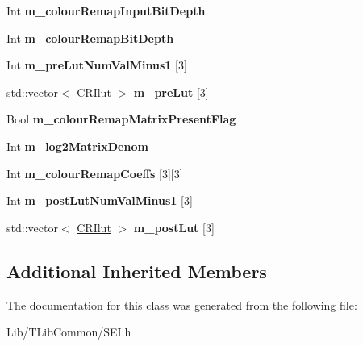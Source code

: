 \begin{DoxyCompactItemize}
Int {\bfseries m\+\_\+colour\+Remap\+Input\+Bit\+Depth}
\item 
\mbox{\label{class_s_e_i_colour_remapping_info_ad3ddd692b51212b40cd3d468e1772eda}} 
Int {\bfseries m\+\_\+colour\+Remap\+Bit\+Depth}
\item 
\mbox{\label{class_s_e_i_colour_remapping_info_aa8bd3d3abc6130df1340ce702e711489}} 
Int {\bfseries m\+\_\+pre\+Lut\+Num\+Val\+Minus1} \mbox{[}3\mbox{]}
\item 
\mbox{\label{class_s_e_i_colour_remapping_info_a01098088d6b2a8e0710ec396111d0517}} 
std\+::vector$<$ \hyperlink{struct_s_e_i_colour_remapping_info_1_1_c_r_ilut}{C\+R\+Ilut} $>$ {\bfseries m\+\_\+pre\+Lut} \mbox{[}3\mbox{]}
\item 
\mbox{\label{class_s_e_i_colour_remapping_info_a83fd91ab23946ef02048a2accc0d787d}} 
Bool {\bfseries m\+\_\+colour\+Remap\+Matrix\+Present\+Flag}
\item 
\mbox{\label{class_s_e_i_colour_remapping_info_a97ecf30ec961cce6f7b96b1757df0920}} 
Int {\bfseries m\+\_\+log2\+Matrix\+Denom}
\item 
\mbox{\label{class_s_e_i_colour_remapping_info_af10c1420862e07cf9831a77776d48329}} 
Int {\bfseries m\+\_\+colour\+Remap\+Coeffs} \mbox{[}3\mbox{]}\mbox{[}3\mbox{]}
\item 
\mbox{\label{class_s_e_i_colour_remapping_info_a78e3e6b3a05fdf36d98f610986c44c0a}} 
Int {\bfseries m\+\_\+post\+Lut\+Num\+Val\+Minus1} \mbox{[}3\mbox{]}
\item 
\mbox{\label{class_s_e_i_colour_remapping_info_abd4971cf45bb1a102137f8a246e73fc3}} 
std\+::vector$<$ \hyperlink{struct_s_e_i_colour_remapping_info_1_1_c_r_ilut}{C\+R\+Ilut} $>$ {\bfseries m\+\_\+post\+Lut} \mbox{[}3\mbox{]}
\end{DoxyCompactItemize}
\subsection*{Additional Inherited Members}


The documentation for this class was generated from the following file\+:\begin{DoxyCompactItemize}
\item 
Lib/\+T\+Lib\+Common/S\+E\+I.\+h\end{DoxyCompactItemize}
